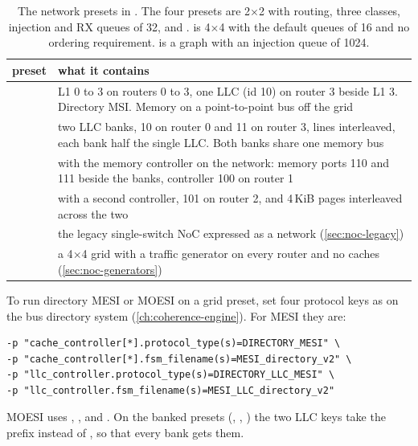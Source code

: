 \begin{table}[htbp]\centering\small
\caption{The network presets in . The four
 presets are 2$\times$2 with  routing, three classes, injection and RX queues
of 32, and .  is 4$\times$4 with the
default queues of 16 and no ordering requirement.  is a  graph with an
injection queue of 1024.}\label{tab:noc-presets}
\begin{tabularx}{\textwidth}{@{}lY@{}}
\toprule preset & what it contains \\ \midrule
{} & L1 0 to 3 on routers 0 to 3, one LLC (id 10) on router 3 beside L1 3. Directory MSI. Memory on a point-to-point bus off the grid \\
 & two LLC banks, 10 on router 0 and 11 on router 3, lines interleaved, each bank half the single LLC. Both banks share one memory bus \\
 &  with the memory controller on the network: memory ports 110 and 111 beside the banks, controller 100 on router 1 \\
 &  with a second controller, 101 on router 2, and 4\,KiB pages interleaved across the two \\
 & the legacy single-switch NoC expressed as a network (\cref{sec:noc-legacy}) \\
 & a 4$\times$4 grid with a traffic generator on every router and no caches (\cref{sec:noc-generators}) \\
\bottomrule
\end{tabularx}
\end{table}

To run directory MESI or MOESI on a grid preset, set four protocol keys as on the bus directory
system (\cref{ch:coherence-engine}). For MESI they are:

\begin{lstlisting}[style=shell]
-p "cache_controller[*].protocol_type(s)=DIRECTORY_MESI" \
-p "cache_controller[*].fsm_filename(s)=MESI_directory_v2" \
-p "llc_controller.protocol_type(s)=DIRECTORY_LLC_MESI" \
-p "llc_controller.fsm_filename(s)=MESI_LLC_directory_v2"
\end{lstlisting}

MOESI uses \code{DIRECTORY\_MOESI}, ,  and
. On the banked presets (, ,
) the two LLC keys take the prefix  instead of
\code{llc\_controller.}, so that every bank gets them.


